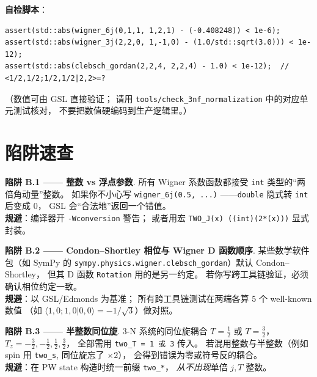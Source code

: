 \noindent
\textbf{自检脚本}：
\begin{lstlisting}[style=cpp, caption={单元自检（伪码）}]
assert(std::abs(wigner_6j(0,1,1, 1,2,1) - (-0.408248)) < 1e-6);
assert(std::abs(wigner_3j(2,2,0, 1,-1,0) - (1.0/std::sqrt(3.0))) < 1e-12);
assert(std::abs(clebsch_gordan(2,2,4, 2,2,4) - 1.0) < 1e-12);  // <1/2,1/2;1/2,1/2|2,2>=?
\end{lstlisting}
（数值可由 GSL 直接验证；
请用 \texttt{tools/check\_3nf\_normalization} 中的对应单元测试核对，
不要把数值硬编码到生产逻辑里。）

\section{陷阱速查}
\label{sec:appB_pitfalls}

\begin{pitfallbox}
\textbf{陷阱 B.1 —— 整数 vs 浮点参数}.
所有 Wigner 系数函数都接受 \texttt{int} 类型的“两倍角动量”整数。
如果你不小心写 \texttt{wigner\_6j(0.5, ...)} ——\texttt{double} 隐式转 \texttt{int} 后变成 0，
GSL 会“合法地”返回一个错值。\\
\textbf{规避}：编译器开 \texttt{-Wconversion} 警告；
或者用宏 \verb|TWO_J(x) ((int)(2*(x)))| 显式封装。
\end{pitfallbox}

\begin{pitfallbox}
\textbf{陷阱 B.2 —— Condon–Shortley 相位与 Wigner D 函数顺序}.
某些数学软件包（如 SymPy 的
\texttt{sympy.physics.wigner.clebsch\_gordan}）默认 Condon–Shortley，
但其 D 函数 \texttt{Rotation} 用的是另一约定。
若你写跨工具链验证，必须确认相位约定一致。\\
\textbf{规避}：以 GSL/Edmonds 为基准；
所有跨工具链测试在两端各算 5 个 well-known 数值
（如 $\langle 1,0; 1,0 | 0,0\rangle = -1/\sqrt{3}$）做对照。
\end{pitfallbox}

\begin{pitfallbox}
\textbf{陷阱 B.3 —— 半整数同位旋}.
3-N 系统的同位旋耦合 $T = \tfrac{1}{2}$ 或 $T = \tfrac{3}{2}$，
$T_z = -\tfrac{3}{2}, -\tfrac{1}{2}, \tfrac{1}{2}, \tfrac{3}{2}$，
全部需用 \texttt{two\_T = 1 或 3} 传入。
若混用整数与半整数（例如 spin 用 \texttt{two\_s}, 同位旋忘了 $\times 2$），
会得到错误为零或符号反的耦合。\\
\textbf{规避}：在 PW state 构造时统一前缀 \texttt{two\_*}，
\emph{从不出现}单倍 $j, T$ 整数。
\end{pitfallbox}

